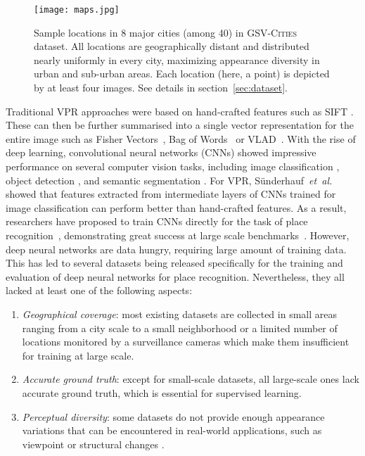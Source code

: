 \documentclass{article}
\newcommand{\etal}{\textit{et~al.}}
\begin{document}
\begin{figure*}[t]
\centering
\texttt{[image: maps.jpg]}
\caption{Sample locations in $8$ major cities (among 40) in \textsc{GSV-Cities} dataset. All locations are geographically distant and distributed nearly uniformly in every city, maximizing appearance diversity in urban and sub-urban areas. Each location (here, a point) is depicted by at least four images. See details in section~\ref{sec:dataset}.}
\label{fig:geo_sample}
\end{figure*}

Traditional VPR approaches were based on hand-crafted features such as SIFT \cite{lowe2004distinctive}. These can then be further summarised into a single vector representation for the entire image such as Fisher Vectors~\cite{jegou2010aggregating, perronnin2010large}, Bag of Words~\cite{philbin2007object, torii2013visual, galvez2012bags} or VLAD~\cite{jegou2011aggregating,arandjelovic2013all}. With the rise of deep learning, convolutional neural networks (CNNs) \cite{lecun1989backpropagation} showed impressive performance on several computer vision tasks, including image classification \cite{he2016deep}, object detection \cite{liu2020deep}, and semantic segmentation \cite{lateef2019survey}.
For VPR, S\"underhauf~\etal~\cite{sunderhauf2015performance} showed that features extracted from intermediate layers of CNNs trained for image classification can perform better than hand-crafted features. As a result, researchers have proposed to train CNNs directly for the task of place recognition~\cite{zhang2021visual}, demonstrating great success at large scale benchmarks~\cite{torii2013visual, warburg2020mapillary}.
However, deep neural networks are data hungry, requiring large amount of training data. This has led to several datasets being released specifically for the training and evaluation of deep neural networks for place recognition. Nevertheless, they all lacked at least one of the following aspects:
\begin{enumerate}[label=(\roman*)]
    \item \textit{Geographical coverage}: most existing datasets are collected in small areas ranging from a city scale \cite{maddern20171} to a small neighborhood \cite{geiger2013vision} or a limited number of locations monitored by a surveillance cameras \cite{chen2017deep} which make them insufficient for training at large scale.
    \item \textit{Accurate ground truth}: except for small-scale datasets, all large-scale ones lack accurate ground truth, which is essential for supervised learning.
    \item \textit{Perceptual diversity}: some datasets do not provide enough appearance variations that can be encountered in real-world applications, such as viewpoint \cite{chen2017deep} or structural changes \cite{olid2018single}.
\end{enumerate}
\end{document}
